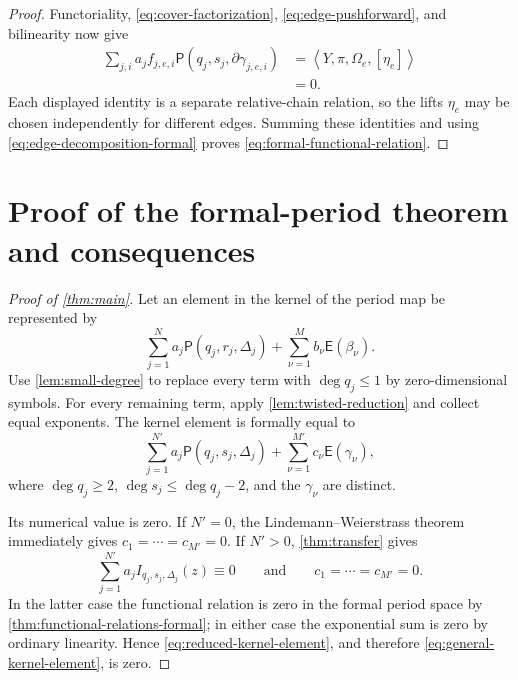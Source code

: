 \documentclass[11pt]{article}
\numberwithin{equation}{section}
\theoremstyle{definition}
\theoremstyle{remark}
\begin{document}
\begin{proof}
Functoriality, \eqref{eq:cover-factorization},
\eqref{eq:edge-pushforward}, and bilinearity now give
\begin{align*}
  \sum_{j,i}a_jf_{j,e,i}
    \mathsf P(q_j,s_j,\partial\gamma_{j,e,i})
  &=\left\langle
      Y,\pi,\Omega_e,[\eta_e]
    \right\rangle\\
  &=0.
\end{align*}
Each displayed identity is a separate relative-chain relation, so the
lifts $\eta_e$ may be chosen independently for different edges.  Summing
these identities and using \eqref{eq:edge-decomposition-formal} proves
\eqref{eq:formal-functional-relation}.
\end{proof}

\section{Proof of the formal-period theorem and consequences}
\label{sec:main-proof}

\begin{proof}[Proof of \cref{thm:main}]
Let an element in the kernel of the period map be represented by
\begin{equation}\label{eq:general-kernel-element}
  \sum_{j=1}^{N}a_j\mathsf P(q_j,r_j,\Delta_j)
  +\sum_{\nu=1}^{M}b_\nu\mathsf E(\beta_\nu).
\end{equation}
Use \cref{lem:small-degree} to replace every term with $\deg q_j\le1$ by
zero-dimensional symbols.  For every remaining term, apply
\cref{lem:twisted-reduction} and collect equal exponents.  The
kernel element is formally equal to
\begin{equation}\label{eq:reduced-kernel-element}
  \sum_{j=1}^{N'}a_j\mathsf P(q_j,s_j,\Delta_j)
  +\sum_{\nu=1}^{M'}c_\nu\mathsf E(\gamma_\nu),
\end{equation}
where $\deg q_j\ge2$, $\deg s_j\le\deg q_j-2$, and the $\gamma_\nu$ are
distinct.

Its numerical value is zero.  If $N'=0$, the
Lindemann--Weierstrass theorem immediately gives
$c_1=\cdots=c_{M'}=0$.  If $N'>0$, \cref{thm:transfer} gives
\[
  \sum_{j=1}^{N'}a_jI_{q_j,s_j,\Delta_j}(z)\equiv0
  \qquad\text{and}\qquad
  c_1=\cdots=c_{M'}=0.
\]
In the latter case the functional relation is zero in the formal period
space by \cref{thm:functional-relations-formal}; in either case the
exponential sum is zero by ordinary linearity.  Hence \eqref{eq:reduced-kernel-element}, and
therefore \eqref{eq:general-kernel-element}, is zero.
\end{proof}
\end{document}
